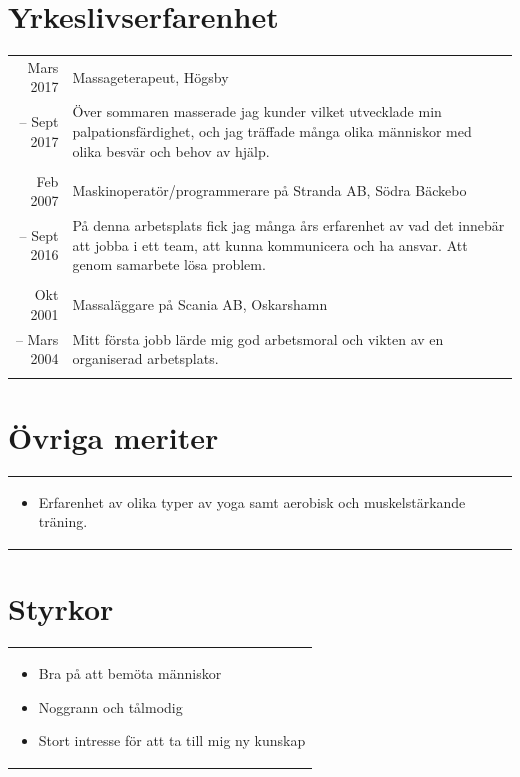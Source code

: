 \documentclass[11pt,a4paper]{article}
\begin{document}
\section{Yrkeslivserfarenhet}
\begin{tabularx}{\textwidth}{r|X}	
	Mars 2017 & Massageterapeut, Högsby \\
	-- Sept 2017 &\footnotesize{Över sommaren masserade jag kunder vilket utvecklade min palpationsfärdighet, och jag träffade många olika människor med olika besvär och behov av hjälp.}\\
	\multicolumn{2}{c}{} \\

	Feb 2007 & Maskinoperatör/programmerare på Stranda AB, Södra Bäckebo \\
	-- Sept 2016&\footnotesize{På denna arbetsplats fick jag många års erfarenhet av vad det innebär att jobba i ett team, att kunna kommunicera och ha ansvar. Att genom samarbete lösa problem.}\\
	\multicolumn{2}{c}{} \\
	
	Okt 2001& Massaläggare på Scania AB, Oskarshamn \\
	-- Mars 2004&\footnotesize{Mitt första jobb lärde mig god arbetsmoral och vikten av en organiserad arbetsplats.}\\
	\multicolumn{2}{c}{} \\

\end{tabularx}

\section{Övriga meriter}
\begin{tabularx}{\textwidth}{X}
	\vspace{-7pt}
\begin{itemize}[leftmargin=0.8em]
	\item Erfarenhet av olika typer av yoga samt aerobisk och muskelstärkande träning.
\end{itemize}
\end{tabularx}

\section{Styrkor}
\begin{tabularx}{\textwidth}{X}
	\vspace{-7pt}
	\begin{itemize}[leftmargin=0.8em]
		\item Bra på att bemöta människor
		\item Noggrann och tålmodig
		\item Stort intresse för att ta till mig ny kunskap
	\end{itemize}
\end{tabularx}
\end{document}

